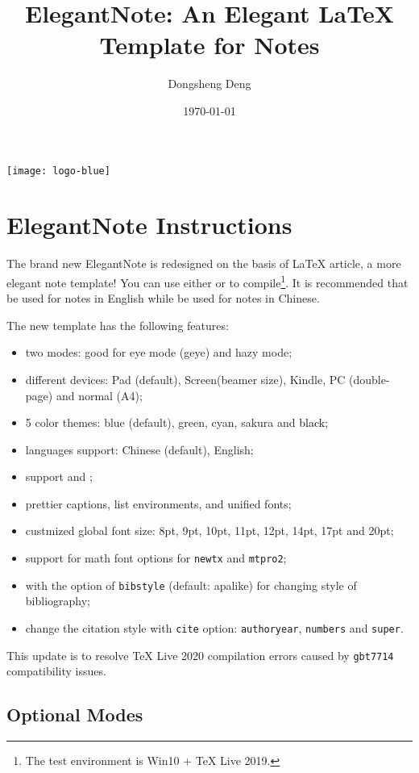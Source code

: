 \documentclass[en,hazy,screen,blue,14pt]{elegantnote}
\title{ElegantNote: An Elegant \LaTeX{} Template for Notes}
\author{Dongsheng Deng}
\institute{Elegant\LaTeX{} Program}
\date{\today}
\begin{document}
\maketitle
\centerline{\texttt{[image: logo-blue]}}

\section{ElegantNote Instructions}
\thispagestyle{empty}
The brand new ElegantNote is redesigned on the basis of \LaTeX{} article, a more elegant note template! You can use either  or  to compile\footnote{The test environment is Win10 + \TeX{} Live 2019.}. It is recommended that  be used for notes in English while  be used for notes in Chinese.

The new template has the following features:
\begin{itemize}
  \item two modes: good for eye mode (geye) and hazy mode;
  \item different devices: Pad (default), Screen(beamer size), Kindle, PC (double-page) and normal (A4);
  \item 5 color themes: \textcolor{eblue}{blue} (default),  \textcolor{egreen}{green}, \textcolor{ecyan}{cyan}, \textcolor{sakura}{sakura} and \textcolor{black}{black};
  \item languages support: Chinese (default), English;
  \item support  and ;
  \item prettier captions, list environments, and unified fonts;
  \item custmized global font size: 8pt, 9pt, 10pt, 11pt, 12pt, 14pt, 17pt and 20pt;
  \item support for math font options for \lstinline{newtx} and \lstinline{mtpro2};
  \item with the option of \lstinline{bibstyle} (default: apalike) for changing style of bibliography;
  \item change the citation style with \lstinline{cite} option: \lstinline{authoryear}, \lstinline{numbers} and \lstinline{super}.
\end{itemize}

This update is to resolve \TeX{} Live 2020 compilation errors caused by \lstinline{gbt7714} compatibility issues.

\subsection{Optional Modes}
\end{document}
